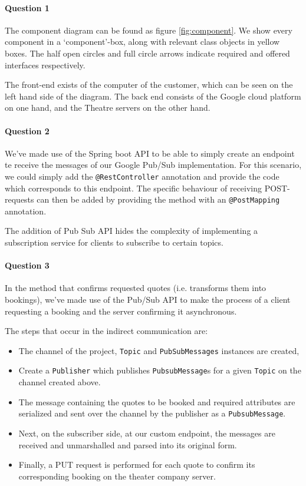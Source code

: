 \documentclass{ds-report}
\begin{document}
	\maketitle

	\paragraph{Question 1}
	The component diagram can be found as figure \ref{fig:component}. We show every component in a `component'-box, along with relevant class objects in yellow boxes. The half open circles and full circle arrows indicate required and offered interfaces respectively.
	
	The front-end exists of the computer of the customer, which can be seen on the left hand side of the diagram. The back end consists of the Google cloud platform on one hand, and the Theatre servers on the other hand.
	\paragraph{Question 2} 
	We've made use of the Spring boot API to be able to simply create an endpoint te receive the messages of our Google Pub/Sub implementation. For this scenario, we could simply add the \texttt{@RestController} annotation and provide the code which corresponds to this endpoint. The specific behaviour of receiving POST-requests can then be added by providing the method with an \texttt{@PostMapping} annotation.
	
	The addition of Pub Sub API hides the complexity of implementing a subscription service for clients to subscribe to certain topics. 
	
	\paragraph{Question 3} 
	In the method that confirms requested quotes (i.e. transforms them into bookings), we've made use of the Pub/Sub API to make the process of a client requesting a booking and the server confirming it asynchronous. 
	
	The steps that occur in the indirect communication are:
	 \begin{itemize}
	 	\item The channel of the project, \texttt{Topic} and \texttt{PubSubMessages} instances are created,
	 	\item Create a \texttt{Publisher} which publishes \texttt{PubsubMessage}s for a given \texttt{Topic} on the channel created above.
	 	\item The message containing the quotes to be booked and required attributes are serialized and sent over the channel by the publisher as a \texttt{PubsubMessage}.
	 	\item Next, on the subscriber side, at our custom endpoint, the messages are received and unmarshalled and parsed into its original form.
	 	\item Finally, a PUT request is performed for each quote to confirm its corresponding booking on the theater company server.
	 \end{itemize}
 
\end{document}
